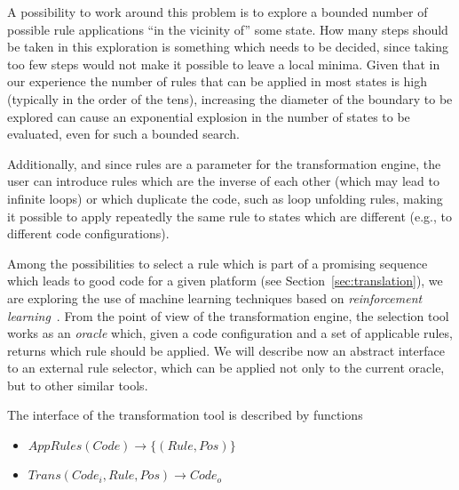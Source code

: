 \documentclass[svgnames,usenames,preprint,nocopyrightspace]{sigplanconf}
\begin{document}
A possibility to work around this problem is to explore a bounded
number of possible rule applications ``in the vicinity of'' some
state.  How many steps should be taken in this exploration is
something which needs to be decided, since taking too few steps would
not make it possible to leave a local minima.  Given that in our
experience the number of rules that can be applied in most states is
high (typically in the order of the tens), increasing the diameter of
the boundary to be explored can cause an exponential explosion in the
number of states to be evaluated, even for such a bounded search.
 


Additionally, and since  rules are a parameter for the
transformation engine, the user can introduce rules which are the
inverse of each other (which may lead to infinite loops) or which
duplicate the code, such as loop unfolding rules, making it possible
to apply repeatedly the same rule to states which are different (e.g., to
different code configurations).





Among the possibilities to select a rule which is part of a promising
sequence which leads to good code for a given platform (see
Section~\ref{sec:translation}), we are exploring the use of machine
learning techniques based on 
\emph{reinforcement learning}~\cite{vigueras16:learning_code_trans}.
From the point of view of the transformation engine, the selection
tool works as an \emph{oracle} which, given a code configuration and a
set of applicable rules, returns which rule should be applied.  We
will describe now an abstract interface to an external rule
selector, which can be applied not only to the current oracle, but
to other similar tools.   





\newcommand{\AppRules}{\mathit{AppRules}}
\newcommand{\Code}{\mathit{Code}}
\newcommand{\Rule}{\mathit{Rule}}
\newcommand{\Pos}{\mathit{Pos}}
\newcommand{\Trans}{\mathit{Trans}}

The interface of the transformation tool is described by functions

\begin{itemize}
\item $\AppRules(\Code) \rightarrow \{(\Rule, \Pos)\}$
\item $\Trans(\Code_i, \Rule, \Pos) \rightarrow \Code_o$
\end{itemize}
\end{document}
